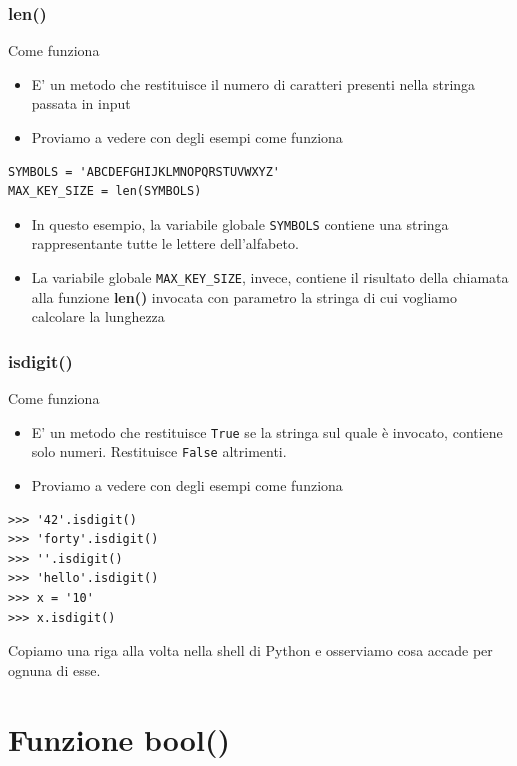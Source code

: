 \documentclass{beamer}
\begin{document}
\begin{frame}[fragile]
\frametitle{len()}
\begin{block}{Come funziona}
	\begin{itemize}
		\item E' un metodo che restituisce il numero di caratteri presenti nella stringa passata in input
		\item Proviamo a vedere con degli esempi come funziona
	\end{itemize}
\end{block}
	\begin{lstlisting}
SYMBOLS = 'ABCDEFGHIJKLMNOPQRSTUVWXYZ'
MAX_KEY_SIZE = len(SYMBOLS)
	\end{lstlisting}	
	\begin{itemize}
		\item In questo esempio, la variabile globale \texttt{SYMBOLS} contiene una stringa rappresentante tutte le lettere dell'alfabeto.
		\item La variabile globale \texttt{MAX\_KEY\_SIZE}, invece, contiene il risultato della chiamata alla funzione \textbf{len()} invocata con parametro la stringa di cui vogliamo calcolare la lunghezza
	\end{itemize}
\end{frame}

\begin{frame}[fragile]
\frametitle{isdigit()}
\begin{block}{Come funziona}
	\begin{itemize}
		\item E' un metodo che restituisce \texttt{True} se la stringa sul quale è invocato, contiene solo numeri. Restituisce \texttt{False} altrimenti.
		\item Proviamo a vedere con degli esempi come funziona
	\end{itemize}
\end{block}
	\begin{lstlisting}
>>> '42'.isdigit()
>>> 'forty'.isdigit()
>>> ''.isdigit()
>>> 'hello'.isdigit()
>>> x = '10'
>>> x.isdigit()
	\end{lstlisting}	
Copiamo una riga alla volta nella shell di Python e osserviamo cosa accade per ognuna di esse.
\end{frame}

\section{Funzione bool()}
\end{document}
